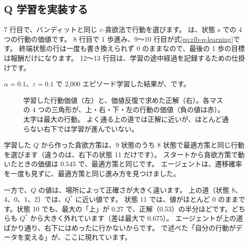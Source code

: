 \subsection*{Q 学習を実装する}


7 行目で、バンディットと同じ $\varepsilon$-貪欲法で行動を選びます。
 は、状態 $s$ での 4 つの行動の価値です。
8 行目で 1 歩進み、9〜10 行目が式\eqref{eq:rlb-q-learning}です。
終端状態の行は一度も書き換えられず 0 のままなので、最後の 1 歩の目標は報酬だけになります。
12〜13 行目は、学習の途中経過を記録するための仕掛けです。

$\alpha=0.1$、$\varepsilon=0.1$ で 2,000 エピソード学習した結果が、です。

\begin{figure}[tbp]
\centering
{}
\caption{学習した行動価値（左）と、価値反復で求めた正解（右）。各マスの 4 つの三角形が、上・右・下・左の行動の価値（負の値は赤）。太字は最大の行動。
よく通る上の道では正解に近いが、ほとんど通らない右下では学習が進んでいない。}
\label{fig:rlb-q-table}
\end{figure}

学習した $Q$ から作った貪欲方策は、9 状態のうち 8 状態で最適方策と同じ行動を選びます（違うのは、右下の状態 11 だけです）。
スタートから貪欲方策で動いたときの価値は $0.545$ で、最適方策と同じです。
エージェントは、遷移確率を一度も見ずに、最適方策と同じ進み方を見つけました。

一方で、$Q$ の値は、場所によって正確さが大きく違います。
上の道（状態 8、4、0、1、2）では、$Q^\ast$ に近い値です。
状態 11 では、値がほとんど 0 のままです。状態 10 でも、最大の「上」が 0.27 で、正解（0.53）の半分ほどです。どちらも $Q^\ast$ から大きく外れています（差は最大で 0.675）。
エージェントが上の道ばかり通り、右下にはめったに行かないからです。
で述べた「自分の行動がデータを変える」が、ここに現れています。

